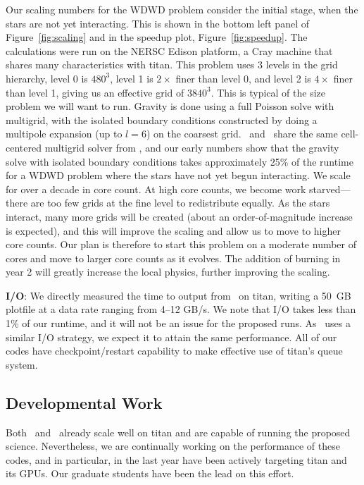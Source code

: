 Our scaling numbers for the WDWD problem consider the initial stage,
when the stars are not yet interacting.  This is shown in the bottom
left panel of Figure~\ref{fig:scaling} and in the speedup plot, Figure~\ref{fig:speedup}.
The calculations were run on the NERSC Edison
platform, a Cray machine that shares many characteristics with titan.
This problem uses 3 levels in the grid hierarchy, level 0 is $480^3$,
level 1 is $2\times$ finer than level 0, and level 2 is $4\times$
finer than level 1, giving us an effective grid of $3840^3$.  This is
typical of the size problem we will want to run.  Gravity is done
using a full Poisson solve with multigrid, with the isolated boundary
conditions constructed by doing a multipole expansion (up to $l=6$) on
the coarsest grid.  \castro\ and \maestro\ share the same
cell-centered multigrid solver from \boxlib, and our early numbers
show that the gravity solve with isolated boundary conditions takes
approximately 25\% of the runtime for a WDWD problem where the stars
have not yet begun interacting.  We scale for over a decade in core count.  At high core counts, we become work
starved---there are too few grids at the fine level to redistribute equally.  As the stars interact, many more grids will be created
(about an order-of-magnitude increase is expected), and this will
improve the scaling and allow us to move to higher core counts.  Our
plan is therefore to start this problem on a moderate number of cores
and move to larger core counts as it evolves.  The addition of burning
in year 2 will greatly increase the local physics, further improving
the scaling.



{\bf I/O}: 
%
We directly measured the time to output from
\maestro\ on titan, writing a 50~GB plotfile at a data rate
ranging from 4--12 GB/s.  We note that I/O takes less than 1\% of our
runtime, and it will not be an issue for the proposed runs.
As \castro\ uses a similar I/O strategy, we expect it to attain the
same performance.  All of our codes have checkpoint/restart capability 
to make effective use of titan's queue system.


\subsection{Developmental Work}


Both \maestro\ and \castro\ already scale well on titan and are
capable of running the proposed science.  Nevertheless, we are
continually working on the performance of these codes, and in
particular, in the last year have been actively targeting titan and
its GPUs.  Our graduate students have been the lead on this effort.

